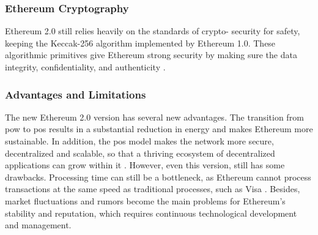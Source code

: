 \subsubsection{Ethereum Cryptography}

Ethereum 2.0 still relies heavily on the standards of crypto- security for safety, keeping the Keccak-256 algorithm implemented by Ethereum 1.0. These 
algorithmic primitives give Ethereum strong security by making sure the data integrity, confidentiality, and authenticity \cite{9129332}.

\subsubsection{Advantages and Limitations}

The new Ethereum 2.0 version has several new advantages. The transition from \gls{pow} to \gls{pos} results in a substantial reduction in energy and makes Ethereum more sustainable. In 
addition, the \gls{pos} model makes the network more secure, decentralized and scalable, so that a thriving ecosystem of decentralized applications can grow within it \cite{ethereumpos}. 
However, even this version, still has some drawbacks. Processing time can still be a bottleneck, as Ethereum cannot process transactions at the same speed as traditional 
processes, such as Visa \cite{9129332}. Besides, market fluctuations and rumors become the main problems for Ethereum's stability and reputation, which requires continuous 
technological development and management.